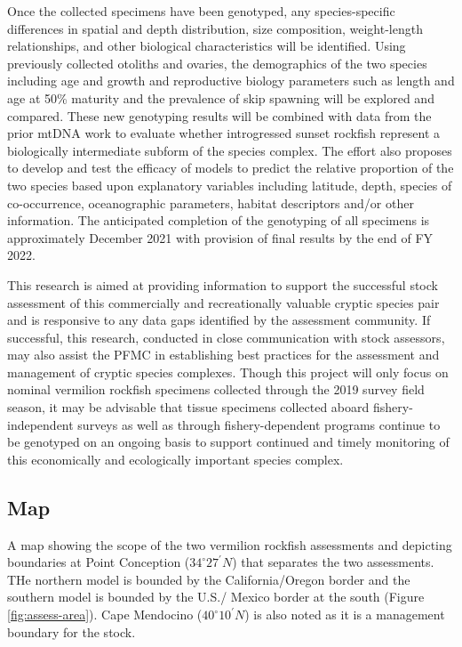 \documentclass[11pt,
  english,
  a4paper,
]{article}
\begin{document}
Once the collected specimens have been genotyped, any species-specific differences in spatial and depth distribution, size composition, weight-length relationships, and other biological characteristics will be identified. Using previously collected otoliths and ovaries, the demographics of the two species including age and growth and reproductive biology parameters such as length and age at 50\% maturity and the prevalence of skip spawning will be explored and compared. These new genotyping results will be combined with data from the prior mtDNA work to evaluate whether introgressed sunset rockfish represent a biologically intermediate subform of the species complex. The effort also proposes to develop and test the efficacy of models to predict the relative proportion of the two species based upon explanatory variables including latitude, depth, species of co-occurrence, oceanographic parameters, habitat descriptors and/or other information. The anticipated completion of the genotyping of all specimens is approximately December 2021 with provision of final results by the end of FY 2022.

This research is aimed at providing information to support the successful stock assessment of this commercially and recreationally valuable cryptic species pair and is responsive to any data gaps identified by the assessment community. If successful, this research, conducted in close communication with stock assessors, may also assist the PFMC in establishing best practices for the assessment and management of cryptic species complexes. Though this project will only focus on nominal vermilion rockfish specimens collected through the 2019 survey field season, it may be advisable that tissue specimens collected aboard fishery-independent surveys as well as through fishery-dependent programs continue to be genotyped on an ongoing basis to support continued and timely monitoring of this economically and ecologically important species complex.


\hypertarget{map}{%
\subsection{Map}\label{map}}

\leavevmode\tagmcend\tagstructend

A map showing the scope of the two vermilion rockfish assessments and depicting boundaries at Point Conception ($34^\circ 27^\prime N$) that separates the two assessments. THe northern model is bounded by the California/Oregon border and the southern model is bounded by the U.S./ Mexico border at the south (Figure \ref{fig:assess-area}). Cape Mendocino ($40^\circ 10^\prime N$) is also noted as it is a management boundary for the stock.
\end{document}
